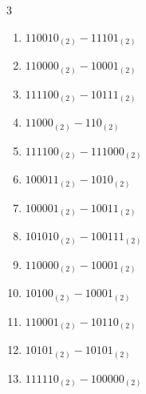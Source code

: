 \begin{multicols}{3}
\begin{enumerate}
\columnbreak %

  \item $110010_{(2)} - 11101_{(2)}$


  \item $110000_{(2)} - 10001_{(2)}$


  \item $111100_{(2)} - 10111_{(2)}$


  \item $11000_{(2)} - 110_{(2)}$


  \item $111100_{(2)} - 111000_{(2)}$


  \item $100011_{(2)} - 1010_{(2)}$


  \item $100001_{(2)} - 10011_{(2)}$


  \item $101010_{(2)} - 100111_{(2)}$


  \item $110000_{(2)} - 10001_{(2)}$


  \item $10100_{(2)} - 10001_{(2)}$


\columnbreak %

  \item $110001_{(2)} - 10110_{(2)}$


  \item $10101_{(2)} - 10101_{(2)}$


  \item $111110_{(2)} - 100000_{(2)}$



\end{enumerate}
\end{multicols}

